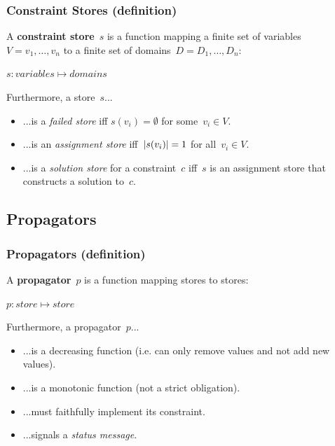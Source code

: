 \documentclass{beamer}
\newcommand{\Dom}[1]{\text{dom}({#1})}
\begin{document}
\begin{frame}
  \frametitle{Constraint Stores (definition)}
  \begin{definition}
    A \textbf{constraint store}~$s$ is a function mapping a finite set of
    variables~$V = v_1, \ldots, v_n$ to a finite set of domains~$D = D_1, \ldots, D_n$:\\
    \begin{center}
      $s: variables \mapsto domains$
    \end{center}
  \end{definition}
  Furthermore, a store~$s$...

  \begin{itemize}
    \item ...is a \emph{failed store} iff $s(v_i) = \emptyset$ for some~$v_i \in V$.
    \item ...is an \emph{assignment store} iff~$\left\lvert s(v_i)\right\rvert = 1$ for all~$v_i \in V$.
    \item ...is a \emph{solution store} for a constraint~$c$ iff~$s$ is an assignment store
      that constructs a solution to~$c$.
  \end{itemize}
\end{frame}


\subsection{Propagators}

\begin{frame}
  \frametitle{Propagators (definition)}
  \begin{definition}[Propagators.]
    A \textbf{propagator}~$p$ is a function mapping stores to stores:
    \begin{center}
      $p: store \mapsto store$ 
    \end{center}
  \end{definition}
  Furthermore, a propagator~$p$...
  \begin{itemize}
    \item ...is a decreasing function (i.e. can only remove values and 
      not add new values).
    \item ...is a monotonic function (not a strict obligation).
    \item ...must faithfully implement its constraint.
    \item ...signals a \emph{status message}.
  \end{itemize}
\end{frame}
\end{document}
